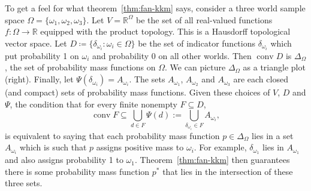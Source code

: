 \documentclass[11pt]{article}
\theoremstyle{definition}
\theoremstyle{remark}
\begin{document}
\begin{figure}
\vspace{-\baselineskip}
\centering
{}
\label{fig:kkm}
\vspace{-\baselineskip}
\end{figure}
To get a feel for what theorem~\ref{thm:fan-kkm} says, consider a three world sample space $\Omega=\{\omega_1,\omega_2,\omega_3\}$. Let $V=\mathbb R^{\Omega}$ be the set of all real-valued functions $f:\Omega\rightarrow\mathbb R$ equipped with the product topology. This is a Hausdorff topological vector space. Let $D\coloneqq\{\delta_{\omega_i}:\omega_i\in\Omega\}$ be the set of indicator functions $\delta_{\omega_i}$ which put probability 1 on $\omega_i$ and probability 0 on all other worlds. Then $\operatorname{conv}D$ is $\Delta_\Omega$, the set of probability mass functions on $\Omega$. We can picture $\Delta_\Omega$ as a triangle plot (right). Finally, let $\Psi(\delta_{\omega_i})=A_{\omega_i}$. The sets $A_{\omega_1}$, $A_{\omega_2}$ and $A_{\omega_3}$ are each closed (and compact) sets of probability mass functions. Given these choices of $V$, $D$ and $\Psi$, the condition that for every finite nonempty $F\subseteq D$,
\[
\operatorname{conv}F\subseteq\bigcup_{d\in F}\Psi(d):=\bigcup_{\delta_{\omega_i}\in F}A_{\omega_i},
\]
is equivalent to saying that each probability mass function $p\in\Delta_\Omega$ lies in a set $A_{\omega_i}$ which is such that $p$ assigns positive mass to $\omega_i$. For example, $\delta_{\omega_1}$ lies in $A_{\omega_1}$ and also assigns probability 1 to $\omega_1$. Theorem~\ref{thm:fan-kkm} then guarantees there is some probability mass function $p^*$ that lies in the intersection of these three sets.
\end{document}

